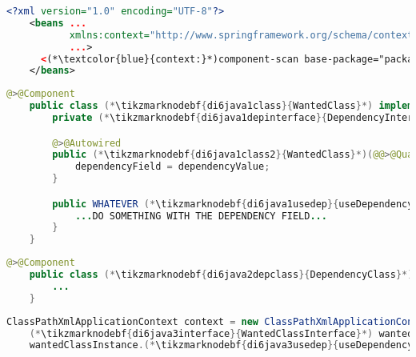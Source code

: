 \enlargethispage{20mm}
\thispagestyle{empty}
\begin{lstlisting}[language=XML, title={Configuration XML}]
    <?xml version="1.0" encoding="UTF-8"?>
    <beans ...
           xmlns:context="http://www.springframework.org/schema/context"
           ...>
      <(*\textcolor{blue}{context:}*)component-scan base-package="package.subfolder"/>
    </beans>
\end{lstlisting}
\begin{lstlisting}[language=Java, title={Wanted class with the constructor}]
    @>@Component
    public class (*\tikzmarknodebf{di6java1class}{WantedClass}*) implements (*\tikzmarknodebf{di6java1interface}{WantedClassInterface}*) {
        private (*\tikzmarknodebf{di6java1depinterface}{DependencyInterface}*) dependencyField;

        @>@Autowired
        public (*\tikzmarknodebf{di6java1class2}{WantedClass}*)(@@>@Qualifier<@@("(*\tikzmarknodebf{di6java1depbeanid}{dependencyClass}[ForestGreen]*)") (*\tikzmarknodebf{di6java1depinterface2}{DependencyInterface}*) dependencyValue) {
            dependencyField = dependencyValue;
        }

        public WHATEVER (*\tikzmarknodebf{di6java1usedep}{useDependency}*)() {
            ...DO SOMETHING WITH THE DEPENDENCY FIELD...
        }
    }
\end{lstlisting}
\begin{lstlisting}[language=Java, title={Dependency class}]
    @>@Component
    public class (*\tikzmarknodebf{di6java2depclass}{DependencyClass}*) implements (*\tikzmarknodebf{di6java2depinterface}{DependencyInterface}*) {
        ...
    }
\end{lstlisting}
\begin{lstlisting}[language=Java, title={Usage}]
    ClassPathXmlApplicationContext context = new ClassPathXmlApplicationContext("configurationFile.xml");
    (*\tikzmarknodebf{di6java3interface}{WantedClassInterface}*) wantedClassInstance = context.getBean("(*\tikzmarknodebf{di6java3beanid}{wantedClass}[ForestGreen]*)", (*\tikzmarknodebf{di6java3interface2}{WantedClassInterface}*).class);
    wantedClassInstance.(*\tikzmarknodebf{di6java3usedep}{useDependency}*)();
\end{lstlisting}
\newpage

